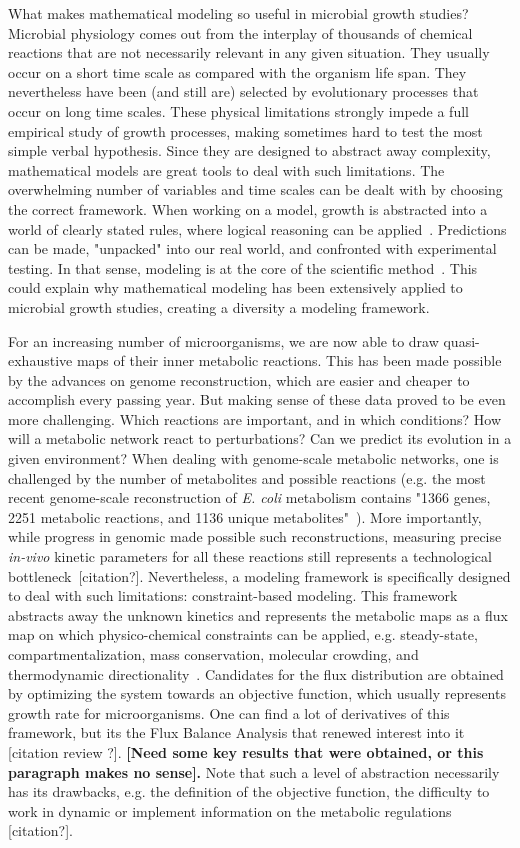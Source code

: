 What makes mathematical modeling so useful in microbial growth studies?
Microbial physiology comes out from the interplay of thousands of chemical reactions that are not necessarily relevant in any given situation.
They usually occur on a short time scale as compared with the organism life span.
They nevertheless have been (and still are) selected by evolutionary processes that occur on long time scales.
These physical limitations strongly impede a full empirical study of growth processes, making sometimes hard to test the most simple verbal hypothesis.
Since they are designed to abstract away complexity, mathematical models are great tools to deal with such limitations.
The overwhelming number of variables and time scales can be dealt with by choosing the correct framework.
When working on a model, growth is abstracted into a world of clearly stated rules, where logical reasoning can be applied~\cite{servedio_not_2014}.
Predictions can be made, "unpacked" into our real world, and confronted with experimental testing.
In that sense, modeling is at the core of the scientific method~\cite{mcgill_calm_2013}.
This could explain why mathematical modeling has been extensively applied to microbial growth studies, creating a diversity a modeling framework.

For an increasing number of microorganisms, we are now able to draw quasi-exhaustive maps of their inner metabolic reactions.
This has been made possible by the advances on genome reconstruction, which are easier and cheaper to accomplish every passing year.
But making sense of these data proved to be even more challenging.
Which reactions are important, and in which conditions?
How will a metabolic network react to perturbations?
Can we predict its evolution in a given environment?
When dealing with genome-scale metabolic networks, one is challenged by the number of metabolites and possible reactions (e.g. the most recent genome-scale reconstruction of \textit{E. coli} metabolism contains "1366 genes, 2251 metabolic reactions, and 1136 unique metabolites"~\cite{orth_comprehensive_2011}).
More importantly, while progress in genomic made possible such reconstructions, measuring precise \textit{in-vivo} kinetic parameters for all these reactions still represents a technological bottleneck~[citation?].
Nevertheless, a modeling framework is specifically designed to deal with such limitations: constraint-based modeling.
This framework abstracts away the unknown kinetics and represents the metabolic maps as a flux map on which physico-chemical constraints can be applied, e.g. steady-state, compartmentalization, mass conservation, molecular crowding, and thermodynamic directionality~\cite{ebrahim_cobrapy_2013}.
Candidates for the flux distribution are obtained by optimizing the system towards an objective function, which usually represents growth rate for microorganisms.
One can find a lot of derivatives of this framework, but its the Flux Balance Analysis that renewed interest into it [citation review ?].
\textbf{[Need some key results that were obtained, or this paragraph makes no sense].}
Note that such a level of abstraction necessarily has its drawbacks, e.g. the definition of the objective function, the difficulty to work in dynamic or implement information on the metabolic regulations [citation?].

